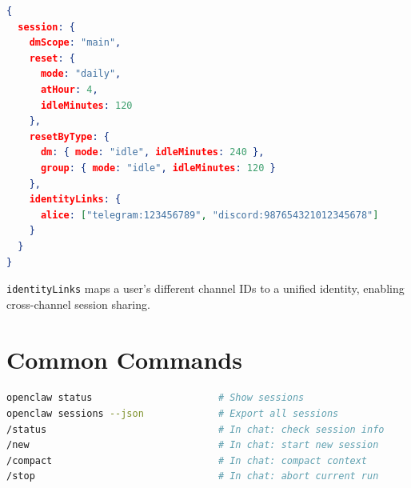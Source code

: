 \begin{lstlisting}[language=json]
{
  session: {
    dmScope: "main",
    reset: {
      mode: "daily",
      atHour: 4,
      idleMinutes: 120
    },
    resetByType: {
      dm: { mode: "idle", idleMinutes: 240 },
      group: { mode: "idle", idleMinutes: 120 }
    },
    identityLinks: {
      alice: ["telegram:123456789", "discord:987654321012345678"]
    }
  }
}
\end{lstlisting}

\texttt{identityLinks} maps a user's different channel IDs to a unified identity, enabling cross-channel session sharing.

\section{Common Commands}

\begin{lstlisting}[language=bash]
openclaw status                      # Show sessions
openclaw sessions --json             # Export all sessions
/status                              # In chat: check session info
/new                                 # In chat: start new session
/compact                             # In chat: compact context
/stop                                # In chat: abort current run
\end{lstlisting}
